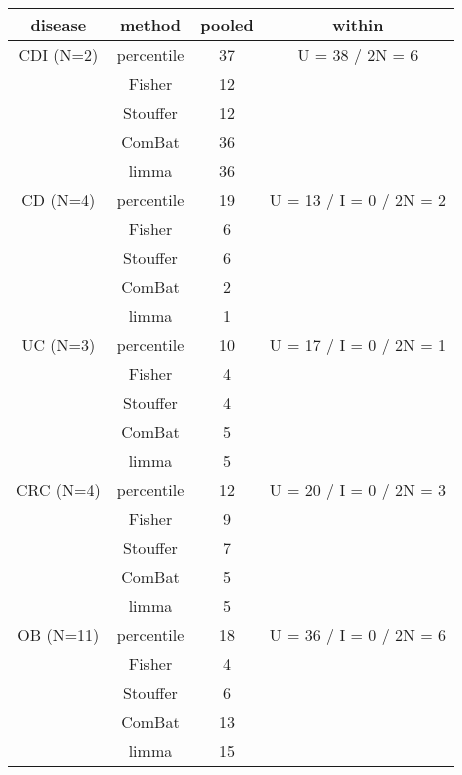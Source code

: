 \begin{table}[H]
\begin{center}
\begin{tabular}{cccc}
	disease & method & pooled & within \\
	\toprule
    CDI (N=2) & percentile & 37 & U = 38 / 2N = 6 \\
     & Fisher & 12 & \\
     & Stouffer & 12 & \\
     & ComBat & 36 & \\
     & limma & 36 & \\
	\midrule
    CD (N=4) & percentile & 19 & U = 13 / I = 0 / 2N = 2 \\
     & Fisher & 6 & \\
     & Stouffer & 6 & \\
     & ComBat & 2 & \\
     & limma & 1 & \\
	\midrule
    UC (N=3) & percentile & 10 & U = 17 / I = 0 / 2N = 1 \\
     & Fisher & 4 & \\
     & Stouffer & 4 & \\
     & ComBat & 5 & \\
     & limma & 5 & \\
	\midrule
    CRC (N=4) & percentile & 12 & U = 20 / I = 0 / 2N = 3 \\
     & Fisher & 9 & \\
     & Stouffer & 7 & \\
     & ComBat & 5 & \\
     & limma & 5 & \\
	\midrule
    OB (N=11) & percentile & 18 & U = 36 / I = 0 / 2N = 6 \\
     & Fisher & 4 & \\
     & Stouffer & 6 & \\
     & ComBat & 13 & \\
     & limma & 15 & \\
	\midrule
	\bottomrule
\end{tabular}
\captionsetup{font=footnotesize,labelfont=footnotesize}

\end{center}
\end{table}
